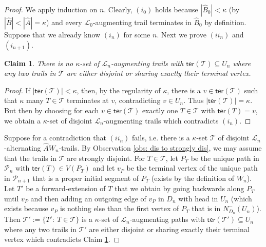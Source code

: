 \documentclass[12pt,a4paper]{amsart}
\theoremstyle{plain}
\newtheorem{claim}[theorem]{Claim}
\theoremstyle{definition}
\begin{document}
\begin{proof}
We apply induction on $ n $. Clearly, $ (i_0) $ holds because $ \left|\widehat{B}_0\right|<\kappa $ (by $ 
\left|\widehat{B}\right|<\left|\widehat{A}\right|=\kappa $) and every $ 
\mathcal{L}_0 $-augmenting trail
terminates in $ 
 \widehat{B}_0 $ by definition. Suppose that we already know $ (i_n) $ for some $ n $.   Next we prove $ (ii_n) $ and $ 
  (i_{n+1})$.
\begin{claim}\label{clm: no lot trail to Un}
 There is no $ \kappa $-set of $ \mathcal{L}_n 
  $-augmenting trails with $ \mathsf{ter}(\mathcal{T})\subseteq U_n $ where any two trails in $ \mathcal{T} $ are either disjoint or sharing 
   exactly their terminal vertex.
\end{claim}
\begin{proof}
If $ \left|\mathsf{ter}(\mathcal{T}) \right|<\kappa$, then, by the regularity of $ \kappa $, there is 
 a 
 $ v\in \mathsf{ter}(\mathcal{T}) $ such that $ \kappa $ many $ T\in \mathcal{T} $ terminates at $ v $, contradicting  $v\in U_n $. Thus $ 
 \left|\mathsf{ter}(\mathcal{T})\right|=\kappa $. But then by choosing for each $ v\in \mathsf{ter}(\mathcal{T}) $ exactly one $ T\in 
 \mathcal{T} $ with $ \mathsf{ter}(T)=v $, we obtain a $ \kappa $-set of disjoint $ \mathcal{L}_n 
 $-augmenting trails which contradicts $ (i_n) $.
\end{proof}
 
 
 

 
 Suppose for a contradiction that $ (ii_n) $ fails, i.e. there is a $ \kappa $-set $ \mathcal{T} $ of disjoint $ \mathcal{L}_n 
 $-alternating $ 
 \widehat{A}W_n $-trails. By Observation \ref{obs: dis to strongly dis}, we may assume that the trails in $ \mathcal{T} $ 
 are strongly disjoint. For $ 
 T\in \mathcal{T} $, let 
 $ P_T $ be the unique path in $ \mathcal{P}_n $ with $ \mathsf{ter}(T)\in V(P_T) $ and let $ v_P $ be the terminal vertex of 
 the unique path in $ \mathcal{P}_{n+1} $ that is a proper initial segment of $ P_T $ (exists by the definition of $ W_n $). 
 Let $ T' $ be a forward-extension of $ 
 T $ that 
 we obtain by going backwards along $ P_T $ until  $ v_P $  and then adding an outgoing edge of $ v_P $ in $ D_n $
 with head in $ U_n $ 
 (which exists because $ v_P $ is nothing else than the first vertex of $ P_T $ that is in $ N_{D_{n}}^{-}(U_n) $). Then $ 
 \mathcal{T}':=\{ T':\ T\in \mathcal{T} \} $ is a $ \kappa $-set of $ \mathcal{L}_n 
 $-augmenting paths with $ \mathsf{ter}(\mathcal{T}')\subseteq U_n $ where any two trails in $ \mathcal{T}' $ are either disjoint or sharing 
 exactly their terminal vertex which contradicts Claim \ref{clm: no lot trail to Un}.
 

\end{proof}
\end{document}
